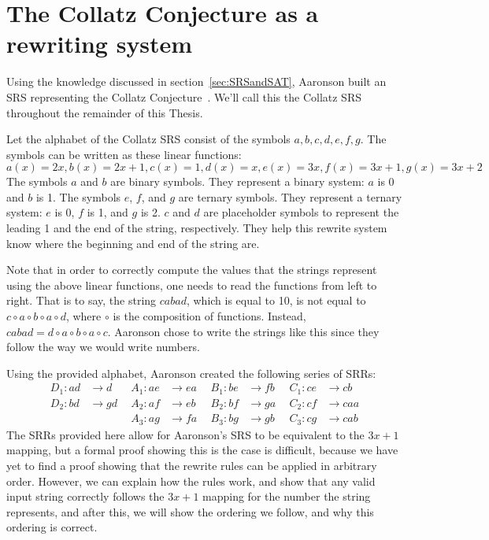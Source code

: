 \documentclass[12pt]{article}
\theoremstyle{definition}
\begin{document}
\section{The Collatz Conjecture as a rewriting system} \label{sec:CollatzSRS}
Using the knowledge discussed in section~\ref{sec:SRSandSAT}, Aaronson built an SRS representing the Collatz Conjecture~\cite{HeuleAaronson}. We'll call this the Collatz SRS throughout the remainder of this Thesis. \par
Let the alphabet of the Collatz SRS consist of the symbols $a, b, c, d, e, f, g$. The symbols can be written as these linear functions:
\[
a(x) = 2x, b(x) = 2x+1, c(x) = 1, d(x) = x, e(x) = 3x, f(x) = 3x+1, g(x) = 3x+2
\]
The symbols $a$ and $b$ are binary symbols. They represent  a binary system: $a$ is 0 and $b$ is 1.  The symbols $e$, $f$, and $g$ are ternary symbols. They represent a ternary system: $e$ is 0, $f$ is 1, and $g$ is 2. $c$ and $d$ are placeholder symbols to represent the leading 1 and the end of the string, respectively. They help this rewrite system know where the beginning and end of the string are. \par
Note that in order to correctly compute the values that the strings represent using the above linear functions, one needs to read the functions from left to right. That is to say, the string $cabad$, which is equal to 10, is not equal to $ c \circ a \circ b \circ a \circ d$, where $\circ$ is the composition of functions. Instead, $cabad = d \circ a \circ b \circ a \circ c$. Aaronson chose to write the strings like this since they follow the way we would write numbers. \par
Using the provided alphabet, Aaronson created the following series of SRRs:
\begin{align*}
    D_1 : ad &\rightarrow d\ & \ A_1 : ae &\rightarrow ea\ & \ B_1 : be &\rightarrow fb\ & \ C_1 : ce &\rightarrow cb \\
    D_2 : bd &\rightarrow gd\ & \ A_2 : af &\rightarrow eb\ & \ B_2 : bf &\rightarrow ga\ & \ C_2 : cf &\rightarrow caa \\
    &\ &\ A_3 : ag &\rightarrow fa\ &\ B_3 : bg &\rightarrow gb\ &\ C_3 : cg &\rightarrow cab
\end{align*}
The SRRs provided here allow for Aaronson's SRS to be equivalent to the $3x+1$ mapping, but a formal proof showing this is the case is difficult, because we have yet to find a proof showing that the rewrite rules can be applied in arbitrary order. However, we can explain how the rules work, and show that any valid input string correctly follows the $3x+1$ mapping for the number the string represents, and after this, we will show the ordering we follow, and why this ordering is correct. \par
\end{document}
